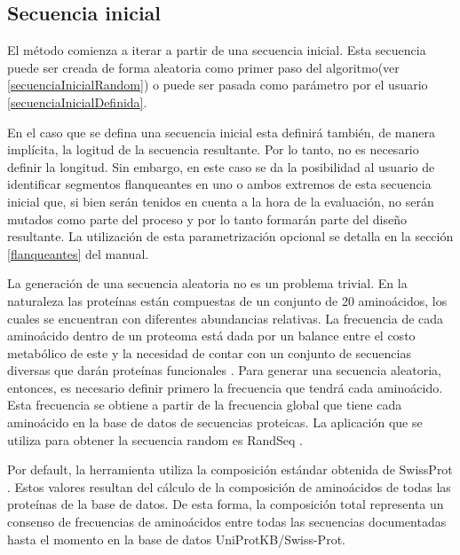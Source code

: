 \subsection{Secuencia inicial}\label{seqInicial}

El método comienza a iterar a partir de una secuencia inicial. 
Esta secuencia puede ser creada de forma aleatoria como primer paso del 
algoritmo(ver \ref{secuenciaInicialRandom}) o puede ser pasada como parámetro por el usuario \ref{secuenciaInicialDefinida}. 

En el caso que se defina una secuencia inicial esta definirá también, de manera implícita, la logitud de la secuencia resultante. Por lo tanto, no es necesario definir la longitud.
Sin embargo, en este caso se da la posibilidad al usuario de identificar segmentos flanqueantes en uno o ambos extremos de esta secuencia inicial que, si bien serán tenidos en cuenta a la hora de la evaluación,
no serán mutados como parte del proceso y por lo tanto formarán parte del diseño resultante. 
La utilización de esta parametrización opcional se detalla en la sección \ref{flanqueantes} del manual.

La generación de una secuencia aleatoria no es un problema trivial. 
En la naturaleza las proteínas están compuestas de un conjunto de 20 aminoácidos, los cuales se encuentran con diferentes abundancias relativas. 
La frecuencia de cada aminoácido dentro de un proteoma está dada por un balance entre el costo metabólico de este y la necesidad de contar con un conjunto de secuencias diversas que darán proteínas funcionales \cite{krick2014amino}. 
Para generar una secuencia aleatoria, entonces, es necesario definir primero la frecuencia que tendrá cada aminoácido. 
Esta frecuencia se obtiene a partir de la frecuencia global que tiene cada aminoácido en la base de datos de secuencias proteicas.
La aplicación que se utiliza para obtener la secuencia random es RandSeq \cite{randseq}.

Por default, la herramienta utiliza la composición estándar obtenida de SwissProt \cite{compositionAA}.  
Estos valores resultan del cálculo de la composición de aminoácidos de todas las proteínas de la base de datos. 
De esta forma, la composición total representa un consenso de frecuencias de aminoácidos entre todas las secuencias documentadas hasta el momento en la base de datos UniProtKB/Swiss-Prot.


